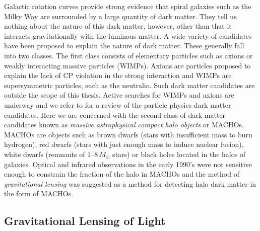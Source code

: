 Galactic rotation curves provide strong evidence that spiral galaxies such
as the Milky Way are surrounded by a large quantity of dark matter. They
tell us nothing about the nature of this dark matter, however, other than that
it interacts gravitationally with the luminous matter. A wide variety of
candidates have been proposed to explain the nature of dark matter. These
generally fall into two classes. The first class consists of elementary
particles such as axions\cite{Weinberg:1977ma} or weakly interacting massive
particles (WIMPs)\cite{Goodman:1984dc}. Axions are particles proposed to
explain the lack of CP violation in the strong interaction and WIMPs are
supersymmetric particles, such as the neutralio. Such dark matter candidates
are outside the scope of this thesis. Active searches for WIMPs and axions are
underway and we refer to \cite{Griest:1995gs} for a review of the particle
physics dark matter candidates.  Here we are concerned with the second class
of dark matter candidates known as \emph{massive astrophysical compact halo
objects} or MACHOs.  MACHOs are objects such as brown dwarfs (stars with
insufficient mass to burn hydrogen), red dwarfs (stars with just enough mass
to induce nuclear fusion), white dwarfs (remnants of $1$--$8\,M_\odot$ stars)
or black holes located in the halos of galaxies.  Optical and infrared
observations in the early 1990's were not sensitive enough to constrain the
fraction of the halo in MACHOs\cite{1994MNRAS.266..775K} and the method of
\emph{gravitational lensing} was suggested as a method for detecting halo dark
matter in the form of MACHOs\cite{Paczynski:1985jf}.

\subsection{Gravitational Lensing of Light}
\label{ss:microlensing}

